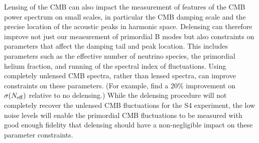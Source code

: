 Lensing of the CMB can also impact the measurement of features of the CMB power spectrum on small scales, in particular the CMB damping scale and the precise location of the acoustic peaks in harmonic space.  Delensing can therefore improve not just our measurement of primordial B modes but also constraints on parameters that affect the damping tail and peak location.
This includes parameters such as the effective number of neutrino species,  the primordial helium fraction, and running of the spectral index of fluctuations.  Using completely unlensed CMB spectra, rather than lensed spectra, can improve constraints on these parameters. (For example, \cite{Baumann:2015rya} find a 20\% improvement on $\sigma(N_\mathrm{eff})$ relative to no delensing.)  While the delensing procedure will not completely recover the unlensed CMB fluctuations for the S4 experiment, the low noise levels will enable the primordial CMB fluctuations to be measured with good enough fidelity that delensing should have a non-negligible impact on these parameter constraints.
